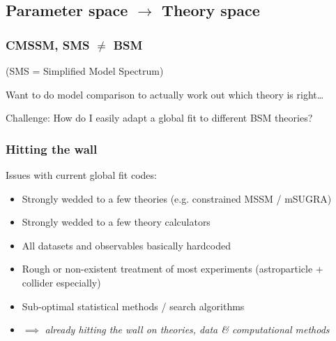 \documentclass[xcolor=dvipsnames]{beamer}
\begin{document}
\subsection{Parameter space $\rightarrow$ Theory space}

\begin{frame}
\frametitle{CMSSM, SMS $\ne$ BSM}

(SMS = Simplified Model Spectrum)
\vspace{3mm}

Want to do model comparison to actually work out which theory is right\ldots
\vspace{3mm}

\begin{exampleblock}{Challenge:}
How do I easily adapt a global fit to different BSM theories?
\end{exampleblock}


\end{frame}

\begin{frame}
\frametitle{Hitting the wall}

Issues with current global fit codes:
\begin{itemize}
\item Strongly wedded to a few theories (e.g. constrained MSSM / mSUGRA)
\item Strongly wedded to a few theory calculators
\item All datasets and observables basically hardcoded
\item Rough or non-existent treatment of most experiments (astroparticle + collider especially)
\item Sub-optimal statistical methods / search algorithms
\item $\implies$ \textit{already hitting the wall on theories, data \& computational methods}
\end{itemize}

\end{frame}
\end{document}
